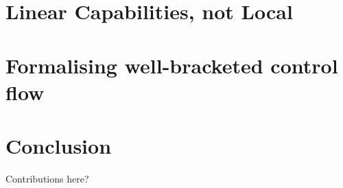 \documentclass[sigplan, review]{acmart}
\begin{document}
\section{Linear Capabilities, not Local}


\section{Formalising well-bracketed control flow}

\section{Conclusion}
Contributions here?


 
\end{document}
